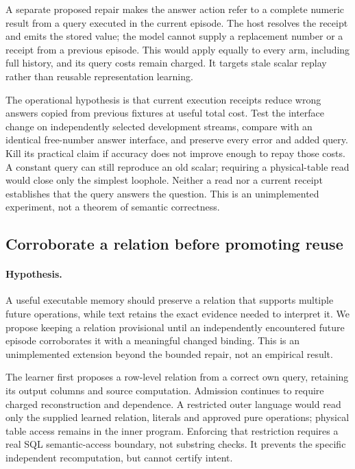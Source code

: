 \documentclass[10pt,twocolumn]{article}
\begin{document}
A separate proposed repair makes the answer action refer to a complete numeric
result from a query executed in the current episode. The host resolves the
receipt and emits the stored value; the model cannot supply a replacement
number or a receipt from a previous episode. This would apply equally to every
arm, including full history, and its query costs remain charged. It targets
stale scalar replay rather than reusable representation learning.

The operational hypothesis is that current execution receipts reduce wrong
answers copied from previous fixtures at useful total cost. Test the interface
change on independently selected development streams, compare with an identical
free-number answer interface, and preserve every error and added query. Kill
its practical claim if accuracy does not improve enough to repay those costs.
A constant query can still reproduce an old scalar; requiring a physical-table
read would close only the simplest loophole. Neither a read nor a current
receipt establishes that the query answers the question. This is an
unimplemented experiment, not a theorem of semantic correctness.

\subsection{Corroborate a relation before promoting reuse}
\paragraph{Hypothesis.}
A useful executable memory should preserve a relation that supports multiple
future operations, while text retains the exact evidence needed to interpret
it. We propose keeping a relation provisional until an independently encountered
future episode corroborates it with a meaningful changed binding. This is an
unimplemented extension beyond the bounded repair, not an empirical result.

The learner first proposes a row-level relation from a correct own query,
retaining its output columns and source computation. Admission continues to
require charged reconstruction and dependence. A restricted outer language
would read only the supplied learned relation, literals and approved pure
operations; physical table access remains in the inner program. Enforcing that
restriction requires a real SQL semantic-access boundary, not substring checks.
It prevents the specific independent recomputation, but cannot certify intent.
\end{document}
